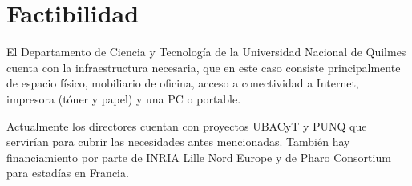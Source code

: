 \documentclass[a4paper,10pt]{article}
\begin{document}
\section{Factibilidad}

El Departamento de Ciencia y Tecnología de la Universidad Nacional de Quilmes cuenta con la infraestructura necesaria, que en este caso consiste principalmente de espacio físico, mobiliario de oficina, acceso a conectividad a Internet, impresora (tóner y papel) y una PC o portable.

Actualmente los directores cuentan con proyectos UBACyT y PUNQ que servirían para cubrir las necesidades antes mencionadas. 
También hay financiamiento por parte de INRIA Lille Nord Europe y de Pharo Consortium para estadías en Francia.



\end{document}
